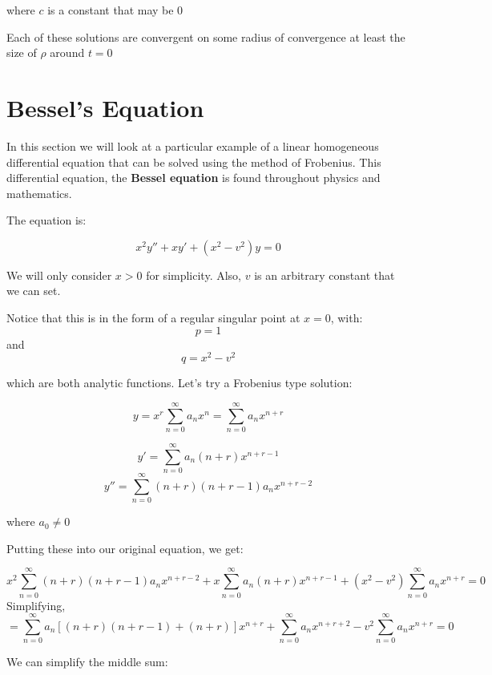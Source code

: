 \documentclass{report}
\begin{document}
{\begin{enumerate}
		where $c$ is a constant that may be 0
		
	\end{enumerate}
	
Each of these solutions are convergent on some radius of convergence at least the size of $\rho$ around $t = 0$


























\section{Bessel's Equation}
In this section we will look at a particular example of a linear homogeneous differential equation that can be solved using the method of Frobenius. This differential equation, the \textbf{Bessel equation} is found throughout physics and mathematics.

The equation is:

$$x^2y'' + xy' + (x^2-v^2)y = 0$$

We will only consider $x>0$ for simplicity. Also, $v$ is an arbitrary constant that we can set.

Notice that this is in the form of a regular singular point at $x=0$, with:
$$
p = 1
$$
and 
$$
q = x^2-v^2
$$

which are both analytic functions. Let's try a Frobenius type solution:

$$y = x^r\sum_{n=0}^\infty a_nx^n = \sum_{n=0}^\infty a_nx^{n+r}$$

$$y' = \sum_{n=0}^\infty a_n(n+r)x^{n+r-1}$$
$$y'' =  \sum_{n=0}^\infty (n+r)(n+r-1)a_nx^{n+r-2}$$

where $a_0 \neq 0$

Putting these into our original equation, we get:

$$
x^2\sum_{n=0}^\infty (n+r)(n+r-1)a_nx^{n+r-2}
+ x\sum_{n=0}^\infty a_n(n+r)x^{n+r-1}
+ (x^2-v^2)\sum_{n=0}^\infty a_nx^{n+r} = 0
$$
Simplifying,
$$
= \sum_{n=0}^\infty a_n[(n+r)(n+r-1) + (n+r)]x^{n+r}
+ \sum_{n=0}^\infty a_nx^{n+r+2} -v^2\sum_{n=0}^\infty a_nx^{n+r} = 0
$$ 

We can simplify the middle sum:

}
\end{document}
